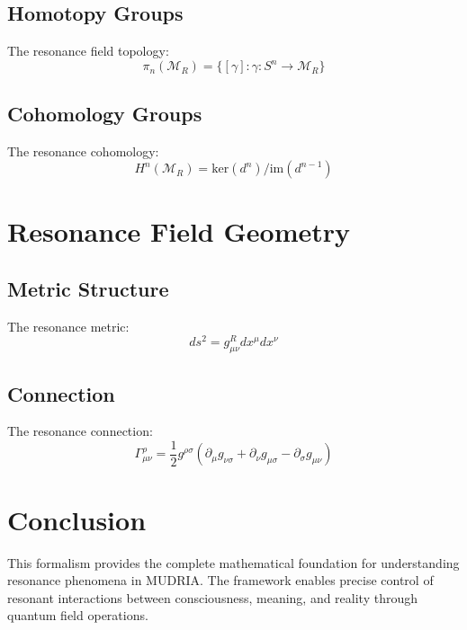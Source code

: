 \documentclass[12pt]{article}
\begin{document}
\subsection{Homotopy Groups}
The resonance field topology:
\begin{equation}
\pi_n(\mathcal{M}_R) = \{[\gamma]:\gamma:S^n\to\mathcal{M}_R\}
\end{equation}
\subsection{Cohomology Groups}
The resonance cohomology:
\begin{equation}
H^n(\mathcal{M}_R) = \text{ker}(d^n)/\text{im}(d^{n-1})
\end{equation}
\section{Resonance Field Geometry}
\subsection{Metric Structure}
The resonance metric:
\begin{equation}
ds^2 = g_{\mu\nu}^R dx^\mu dx^\nu
\end{equation}
\subsection{Connection}
The resonance connection:
\begin{equation}
\Gamma_{\mu\nu}^{\rho} = \frac{1}{2}g^{\rho\sigma}(\partial_\mu g_{\nu\sigma} + \partial_\nu g_{\mu\sigma} - \partial_\sigma g_{\mu\nu})
\end{equation}
\section{Conclusion}
This formalism provides the complete mathematical foundation for understanding resonance phenomena in MUDRIA. The framework enables precise control of resonant interactions between consciousness, meaning, and reality through quantum field operations.
\end{document}
